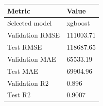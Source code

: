 \begin{tabular}{ll}
\hline
Metric & Value \\
\hline
Selected model & xgboost \\
Validation RMSE & 111003.71 \\
Test RMSE & 118687.65 \\
Validation MAE & 65533.19 \\
Test MAE & 69904.96 \\
Validation R2 & 0.896 \\
Test R2 & 0.9007 \\
\hline
\end{tabular}

